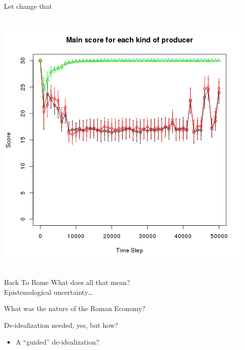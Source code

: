 \documentclass[8pt, handout=show,notes=show]{beamer}
\begin{document}
\begin{frame}{Let change that}
\begin{columns}
		\includegraphics[width=\textwidth]{./scoreEx2b.png}
	\end{columns}
	
\end{frame}

\begin{frame}{Back To Rome}
	What does all that mean?\\

	Epistemological uncertainty\dots
	\vfill
	\begin{center}
		\Huge
		What was the nature of the Roman Economy?\\
	\end{center}
	\vfill
	
	De-idealization needed, yes, but how?
	\begin{itemize}
		\item A ``guided'' de-idealization? 
	\end{itemize}
	
\end{frame}
\end{document}
